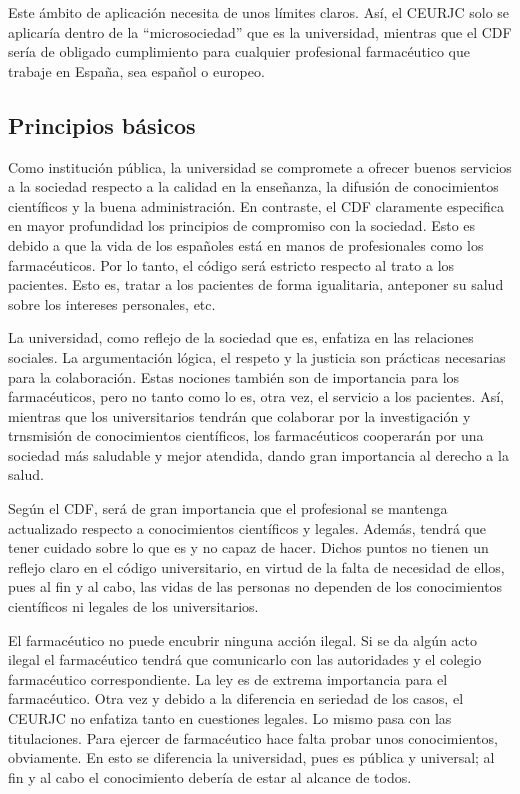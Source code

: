 \documentclass[11pt,a4paper]{article}
\begin{document}
Este ámbito de aplicación necesita de unos límites claros. Así, el CEURJC solo se aplicaría dentro de la ``microsociedad'' que es la universidad, mientras que el CDF sería de obligado cumplimiento para cualquier profesional farmacéutico que trabaje en España, sea español o europeo. 

\subsection{Principios básicos}
Como institución pública, la universidad se compromete a ofrecer buenos servicios a la sociedad respecto a la calidad en la enseñanza, la difusión de conocimientos científicos y la buena administración. En contraste, el CDF claramente especifica en mayor profundidad los principios de compromiso con la sociedad. Esto es debido a que la vida de los españoles está en manos de profesionales como los farmacéuticos. Por lo tanto, el código será estricto respecto al trato a los pacientes. Esto es, tratar a los pacientes de forma igualitaria, anteponer su salud sobre los intereses personales, etc. 

La universidad, como reflejo de la sociedad que es, enfatiza en las relaciones sociales. La argumentación lógica, el respeto y la justicia son prácticas necesarias para la colaboración. Estas nociones también son de importancia para los farmacéuticos, pero no tanto como lo es, otra vez, el servicio a los pacientes. Así, mientras que los universitarios tendrán que colaborar por la investigación y trnsmisión de conocimientos científicos, los farmacéuticos cooperarán por una sociedad más saludable y mejor atendida, dando gran importancia al derecho a la salud. 

Según el CDF, será de gran importancia que el profesional se mantenga actualizado respecto a conocimientos científicos y legales. Además, tendrá que tener cuidado sobre lo que es y no capaz de hacer. Dichos puntos no tienen un reflejo claro en el código universitario, en virtud de la falta de necesidad de ellos, pues al fin y al cabo, las vidas de las personas no dependen de los conocimientos científicos ni legales de los universitarios. 

El farmacéutico no puede encubrir ninguna acción ilegal. Si se da algún acto ilegal el farmacéutico tendrá que comunicarlo con las autoridades y el colegio farmacéutico correspondiente. La ley es de extrema importancia para el farmacéutico. Otra vez y debido a la diferencia en seriedad de los casos, el CEURJC no enfatiza tanto en cuestiones legales. Lo mismo pasa con las titulaciones. Para ejercer de farmacéutico hace falta probar unos conocimientos, obviamente. En esto se diferencia la universidad, pues es pública y universal; al fin y al cabo el conocimiento debería de estar al alcance de todos. 
\end{document}
